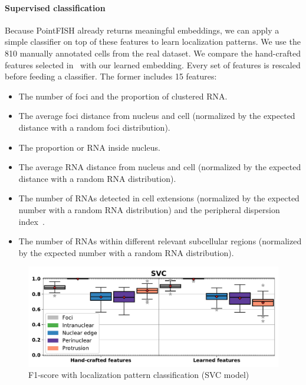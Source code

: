 \paragraph{Supervised classification}

Because PointFISH already returns meaningful embeddings, we can apply a simple classifier on top of these features to learn localization patterns.
We use the 810 manually annotated cells from the real dataset.
We compare the hand-crafted features selected in~\cite{CHOUAIB_2020} with our learned embedding.
Every set of features is rescaled before feeding a classifier.
The former includes 15 features:

\begin{itemize}
	\item The number of foci and the proportion of clustered \ac{RNA}.
	\item The average foci distance from nucleus and cell (normalized by the expected distance with a random foci distribution).
	\item The proportion or \ac{RNA} inside nucleus.
	\item The average \ac{RNA} distance from nucleus and cell (normalized by the expected distance with a random \ac{RNA} distribution).
	\item The number of \ac{RNA}s detected in cell extensions (normalized by the expected number with a random \ac{RNA} distribution) and the peripheral dispersion index~\cite{stueland_rdi_2019}.
	\item The number of \ac{RNA}s within different relevant subcellular regions (normalized by the expected number with a random \ac{RNA} distribution).
\end{itemize}

\begin{figure}[h]
    \centering
	\includegraphics[clip, trim=0cm 0cm 0cm 1cm, width=1\textwidth]{figures/chapter4/f1_SVC}
    \caption{F1-score with localization pattern classification (SVC model)}
    \label{fig:f1_SVC_real}
\end{figure}

